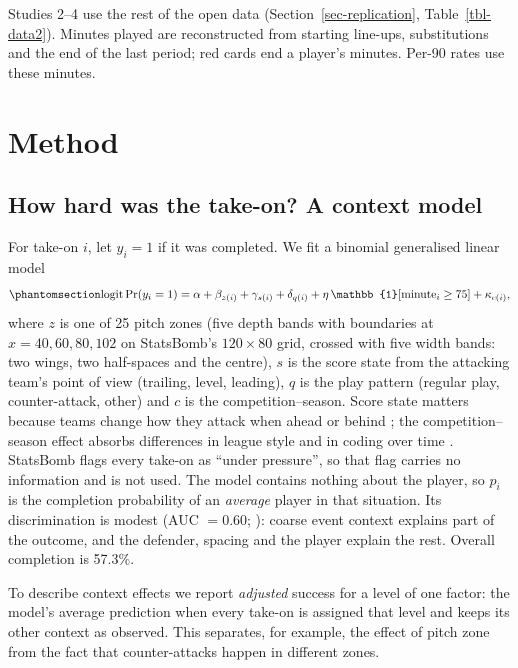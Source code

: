 \documentclass[
  12pt]{article}
\begin{document}
Studies 2--4 use the rest of the open data
(Section~\ref{sec-replication}, Table~\ref{tbl-data2}). Minutes played
are reconstructed from starting line-ups, substitutions and the end of
the last period; red cards end a player's minutes. Per-90 rates use
these minutes.

\section{Method}\label{sec-method}

\subsection{How hard was the take-on? A context
model}\label{how-hard-was-the-take-on-a-context-model}

For take-on \(i\), let \(y_i=1\) if it was completed. We fit a binomial
generalised linear model
\begin{equation}\protect\phantomsection\label{eq-glm}{\operatorname{logit}\Pr(y_i=1) = \alpha + \beta_{z(i)} + \gamma_{s(i)} + \delta_{q(i)} + \eta\,\mathbb{1}[\text{minute}_i\ge 75] + \kappa_{c(i)},}\end{equation}
where \(z\) is one of 25 pitch zones (five depth bands with boundaries
at \(x=40,60,80,102\) on StatsBomb's \(120\times80\) grid, crossed with
five width bands: two wings, two half-spaces and the centre), \(s\) is
the score state from the attacking team's point of view (trailing,
level, leading), \(q\) is the play pattern (regular play,
counter-attack, other) and \(c\) is the competition--season. Score state
matters because teams change how they attack when ahead or behind
\citep{lago2009, lagopenas2010}; the competition--season effect absorbs
differences in league style and in coding over time
\citep{barnes2014, bush2015, wallace2014}. StatsBomb flags every take-on
as ``under pressure'', so that flag carries no information and is not
used. The model contains nothing about the player, so \(\hat p_i\) is
the completion probability of an \emph{average} player in that
situation. Its discrimination is modest (AUC \(=0.60\);
\citep{hanley1982}): coarse event context explains part of the outcome,
and the defender, spacing and the player explain the rest. Overall
completion is 57.3\%.

To describe context effects we report \emph{adjusted} success for a
level of one factor: the model's average prediction when every take-on
is assigned that level and keeps its other context as observed. This
separates, for example, the effect of pitch zone from the fact that
counter-attacks happen in different zones.
\end{document}
